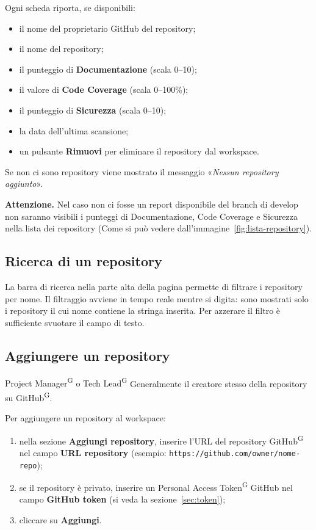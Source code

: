 \documentclass[a4paper, 11pt]{article}
\begin{document}
Ogni scheda riporta, se disponibili:
\begin{itemize}
    \item il nome del proprietario GitHub del repository;
    \item il nome del repository;
    \item il punteggio di \textbf{Documentazione} (scala 0--10);
    \item il valore di \textbf{Code Coverage} (scala 0--100\%);
    \item il punteggio di \textbf{Sicurezza} (scala 0--10);
    \item la data dell'ultima scansione;
    \item un pulsante \textbf{Rimuovi} per eliminare il repository dal workspace.
\end{itemize}

Se non ci sono repository viene mostrato il messaggio «\textit{Nessun repository aggiunto}».


\begin{warnbox}
\textbf{Attenzione.} Nel caso non ci fosse un report disponibile del branch di develop non saranno visibili i punteggi di Documentazione, Code Coverage e Sicurezza nella lista dei repository (Come si può vedere dall'immagine~\ref{fig:lista-repository}).
\end{warnbox}

\subsection{Ricerca di un repository}
La barra di ricerca nella parte alta della pagina permette di filtrare i repository per nome. Il filtraggio avviene in tempo reale mentre si digita: sono mostrati solo i repository il cui nome contiene la stringa inserita. Per azzerare il filtro è sufficiente svuotare il campo di testo.

\subsection{Aggiungere un repository}

\begin{rolebox}{Project Manager\textsuperscript{G} o Tech Lead\textsuperscript{G}}
Generalmente il creatore stesso della repository su GitHub\textsuperscript{G}.
\end{rolebox}

\noindent Per aggiungere un repository al workspace:
\begin{enumerate}
    \item nella sezione \textbf{Aggiungi repository}, inserire l'URL del repository GitHub\textsuperscript{G} nel campo \textbf{URL repository} (esempio: \texttt{https://github.com/owner/nome-repo});
    \item se il repository è privato, inserire un Personal Access Token\textsuperscript{G} GitHub nel campo \textbf{GitHub token} (si veda la sezione~\ref{sec:token});
    \item cliccare su \textbf{Aggiungi}.
\end{enumerate}
\end{document}
